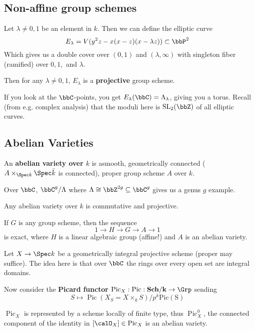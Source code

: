 \documentclass[12pt]{article}
\begin{document}
\subsection{Non-affine group schemes}
\begin{ex}
	Let $\lambda\ne 0,1$ be an element in $k$. Then we can define the elliptic curve 
	\[E_\lambda=V(y^2z-x(x-z)(x-\lambda z))\subset \bbP^2\]
	Which gives us a double cover over $(0,1)$ and $(\lambda,\infty)$ with singleton fiber (ramified) over $0,1,$ and $\lambda$.

	Then for any $\lambda\ne 0,1$, $E_\lambda$ is a \textbf{projective} group scheme.
\end{ex}
\begin{rmk}
	If you look at the $\bbC$-points, you get $E_\lambda(\bbC)=\Lambda_\lambda$, giving you a torus. Recall (from e.g. complex analysis) that the 
	moduli here is $\operatorname{SL}_2(\bbZ)$ of all elliptic curves.
\end{rmk}

\subsection{Abelian Varieties}
\begin{defn}
	An \textbf{abelian variety over $k$} is asmooth, geometrically connected ($A\times_{\Spec k}\Spec\bar k$ is connected), proper group scheme $A$ over $k$.
\end{defn}
\begin{ex}
	Over $\bbC$, $\bbC^g/\Lambda$ where $\Lambda\cong \bbZ^{2g}\subseteq \bbC^g$ gives us a genus $g$ example.
\end{ex}
\begin{thm}
	Any abelian variety over $k$ is commutative and projective.
\end{thm}
\begin{thm}[Chevalley]
	If $G$ is any group scheme, then the sequence 
	\[1\to H\to G\to A\to 1\]
	is exact, where $H$ is a linear algebraic group (affine!) and $A$ is an abelian variety.
\end{thm}
\begin{ex}
	Let $X\to \Spec k$ be a geometrically integral projective scheme (proper may suffice). The idea here is that over $\bbC$
	the rings over every open set are integral domains.

	Now consider the \textbf{Picard functor} $\operatorname{Pic}_X:\operatorname{Pic}:\mathbf{Sch/k}\to \Grp$ sending 
	\[S\mapsto \operatorname{Pic}(X_S=X\times_k S)/p^k\operatorname{Pic(S)}\]
\end{ex}
\begin{thm}
	$\operatorname{Pic}_X$ is represented by a scheme locally of finite type, thus $\operatorname{Pic}_X^0$, the connected 
	component of the identity in $[\calO_X]\in\operatorname{Pic}_X$ is an abelian variety.
\end{thm}
\end{document}
